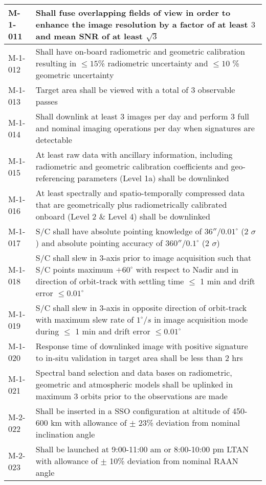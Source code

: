 \begin{table*}[htbp]
\begin{tabular}{l p{15cm}}
		\hline
		 M-1-011 & Shall fuse overlapping fields of view in order to enhance the image resolution by a factor of at least $3$ and mean SNR of at least $\sqrt{3}$ \\
			\hline
		 M-1-012 & Shall have on-board radiometric and geometric calibration resulting in $\leq 15$\% radiometric uncertainty and $\leq 10$ \% geometric uncertainty \\
		\hline
		 M-1-013 & Target area shall be viewed with a total of 3 observable passes   \\
			\hline
		 M-1-014 & Shall downlink at least 3 images per day and perform 3 full and nominal imaging operations per day when signatures are detectable \\ 
		\hline
		 M-1-015 & At least raw data with ancillary information, including radiometric and geometric calibration coefficients and geo-referencing parameters (Level 1a) shall be downlinked \\
			\hline
			M-1-016 & At least spectrally and spatio-temporally compressed data that are geometrically plus radiometrically calibrated onboard (Level 2 \& Level 4) shall be downlinked \\
			\hline
			M-1-017  & S/C shall have absolute pointing knowledge of $36''/0.01^{\circ}$ (2 $\sigma$) and absolute pointing accuracy of $360''/0.1^{\circ}$ (2 $\sigma$)  \\
			\hline
			M-1-018  & S/C shall slew in 3-axis prior to image acquisition such that S/C points maximum $+60^{\circ}$ with respect to Nadir and in direction of orbit-track with settling time $\leq$ 1 min and drift error $\leq 0.01^{\circ}$ \\
			\hline
			M-1-019  & S/C shall slew in 3-axis in opposite direction of orbit-track with maximum slew rate of $1^{\circ}/s$ in image acquisition mode during $\leq$ 1 min and drift error $\leq 0.01^{\circ}$\\
			\hline 
			M-1-020  & Response time of downlinked image with positive signature to in-situ validation in target area shall be less than 2 hrs \\
			\hline
			M-1-021 & Spectral band selection and data bases on radiometric, geometric and atmospheric models shall be uplinked in maximum 3 orbits prior to the observations are made \\
			\hline
			M-2-022  & Shall be inserted in a SSO configuration at altitude of 450-600 km with allowance of $\pm$ 23\% deviation from nominal inclination angle   \\
			\hline
			M-2-023  & Shall be launched at 9:00-11:00 am or 8:00-10:00 pm LTAN with allowance of $\pm$ 10\% deviation from nominal RAAN angle  \\

\end{tabular}
\end{table*}
